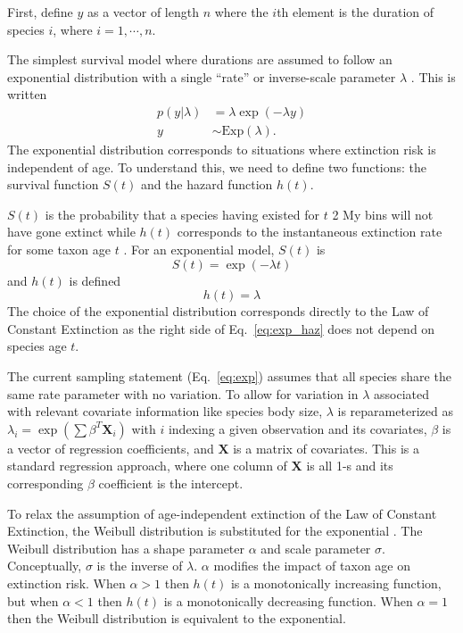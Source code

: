 \documentclass{pnastwo}
\begin{document}
\begin{article}
\begin{materials}
First, define \(y\) as a vector of length \(n\) where the \(i\)th element is the duration of species \(i\), where \(i = 1,\cdots,n\).

The simplest survival model where durations are assumed to follow an exponential distribution with a single ``rate'' or inverse-scale parameter \(\lambda\) \cite{Klein2003}. This is written
\begin{align}
  p(y | \lambda) &= \lambda \exp(-\lambda y) \nonumber \\
  y &\sim \mathrm{Exp}(\lambda).
  \label{eq:exp}
\end{align}
The exponential distribution corresponds to situations where extinction risk is independent of age. To understand this, we need to define two functions: the survival function \(S(t)\) and the hazard function \(h(t)\). 

\(S(t)\) is the probability that a species having existed for \(t\) 2 My bins will not have gone extinct while \(h(t)\) corresponds to the instantaneous extinction rate for some taxon age \(t\) \cite{Klein2003}. For an exponential model, \(S(t)\) is 
\begin{equation}
  S(t) = \exp(-\lambda t)
  \label{eq:exp_surv}
\end{equation}
and \(h(t)\) is defined
\begin{equation}
  h(t) = \lambda
  \label{eq:exp_haz}
\end{equation}
The choice of the exponential distribution corresponds directly to the Law of Constant Extinction \cite{VanValen1973} as the right side of Eq.~\ref{eq:exp_haz} does not depend on species age \(t\). 

The current sampling statement (Eq.~\ref{eq:exp}) assumes that all species share the same rate parameter with no variation. To allow for variation in \(\lambda\) associated with relevant covariate information like species body size, \(\lambda\) is reparameterized as \(\lambda_{i} = \exp(\sum \beta^{T}\mathbf{X}_{i})\) with \(i\) indexing a given observation and its covariates, \(\beta\) is a vector of regression coefficients, and \(\mathbf{X}\) is a matrix of covariates. This is a standard regression approach, where one column of \(\mathbf{X}\) is all 1-s and its corresponding \(\beta\) coefficient is the intercept. 

To relax the assumption of age-independent extinction of the Law of Constant Extinction, the Weibull distribution is substituted for the exponential \cite{Klein2003}. The Weibull distribution has a shape parameter \(\alpha\) and scale parameter \(\sigma\). Conceptually, \(\sigma\) is the inverse of \(\lambda\). \(\alpha\) modifies the impact of taxon age on extinction risk. When \(\alpha > 1\) then \(h(t)\) is a monotonically increasing function, but when \(\alpha < 1\) then \(h(t)\) is a monotonically decreasing function. When \(\alpha = 1\) then the Weibull distribution is equivalent to the exponential.


\end{materials}
\end{article}
\end{document}
